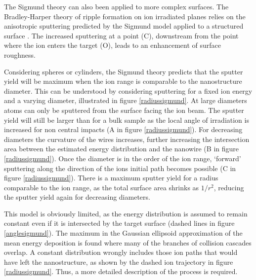 The Sigmund theory can also been applied to more complex surfaces. The Bradley-Harper theory of ripple formation on ion irradiated planes relies on the anisotropic sputtering predicted by the Sigmund model applied to a structured surface \cite{sigmund_mechanism_1973,bradley_theory_1988}. The increased sputtering at a point (C), downstream from the point where the ion enters the target (O), leads to an enhancement of surface roughness.

Considering spheres or cylinders, the Sigmund theory predicts that the sputter yield will be maximum when the ion range is comparable to the nanostructure diameter. This can be understood by considering sputtering for a fixed ion energy and a varying diameter, illustrated in figure \ref{radiussigmund}. At large diameters atoms can only be sputtered from the surface facing the ion beam. The sputter yield will still be larger than for a bulk sample as the local angle of irradiation is increased for non central impacts (A in figure \ref{radiussigmund}). For decreasing diameters the curvature of the wires increases, further increasing the intersection area between the estimated energy distribution and the nanowire (B in figure \ref{radiussigmund}). Once the diameter is in the order of the ion range, `forward' sputtering along the direction of the ions initial path becomes possible (C in figure \ref{radiussigmund}). There is a maximum sputter yield for a radius comparable to the ion range, as the total surface area shrinks as $1/r^2$, reducing the sputter yield again for decreasing diameters. 

This model is obviously limited, as the energy distribution is assumed to remain constant even if it is intersected by the target surface (dashed lines in figure \ref{anglesigmund}). The maximum in the Gaussian ellipsoid approximation of the mean energy deposition is found where many of the branches of collision cascades overlap. A constant distribution wrongly includes those ion paths that would have left the nanostructure, as shown by the dashed ion trajectory in figure \ref{radiussigmund}. Thus, a more detailed description of the process is required.

